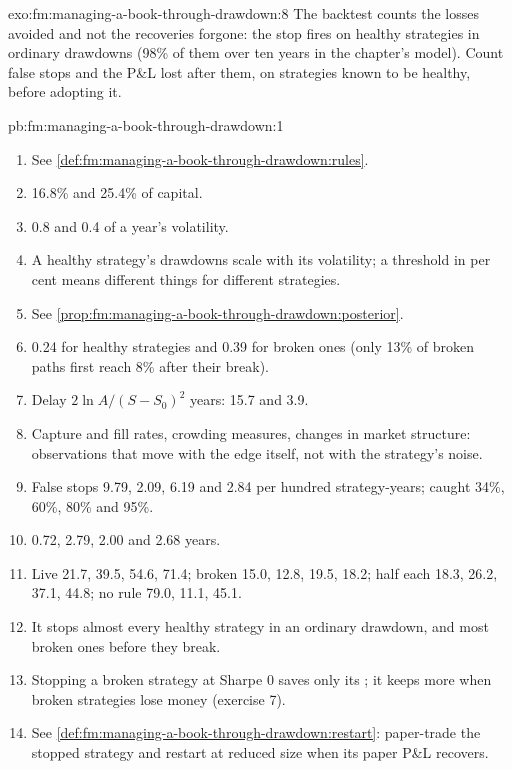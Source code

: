\begin{solution}{exo:fm:managing-a-book-through-drawdown:8}
The backtest counts the losses avoided and not the recoveries forgone: the stop fires on healthy strategies in ordinary drawdowns (98\% of them
over ten years in the chapter's model). Count false stops and the P\&L lost after them, on strategies known to be healthy, before adopting it.
\end{solution}

\begin{solution}{pb:fm:managing-a-book-through-drawdown:1}
\begin{enumerate}
\item See \cref{def:fm:managing-a-book-through-drawdown:rules}.
\item 16.8\% and 25.4\% of capital.
\item 0.8 and 0.4 of a year's volatility.
\item A healthy strategy's drawdowns scale with its volatility; a threshold in per cent means different things for different strategies.
\item See \cref{prop:fm:managing-a-book-through-drawdown:posterior}.
\item 0.24 for healthy strategies and 0.39 for broken ones (only 13\% of broken paths first reach 8\% after their break).
\item Delay $2\ln A/(S-S_0)^2$ years: 15.7 and 3.9.
\item Capture and fill rates, crowding measures, changes in market structure: observations that move with the edge itself, not with the
strategy's noise.
\item False stops 9.79, 2.09, 6.19 and 2.84 per hundred strategy-years; caught 34\%, 60\%, 80\% and 95\%.
\item 0.72, 2.79, 2.00 and 2.68 years.
\item Live 21.7, 39.5, 54.6, 71.4; broken 15.0, 12.8, 19.5, 18.2; half each 18.3, 26.2, 37.1, 44.8; no rule 79.0, 11.1, 45.1.
\item It stops almost every healthy strategy in an ordinary drawdown, and most broken ones before they break.
\item Stopping a broken strategy at Sharpe 0 saves only its ; it keeps more when broken strategies lose money (exercise 7).
\item See \cref{def:fm:managing-a-book-through-drawdown:restart}: paper-trade the stopped strategy and restart at reduced size when its paper
P\&L recovers.

\end{enumerate}
\end{solution}

